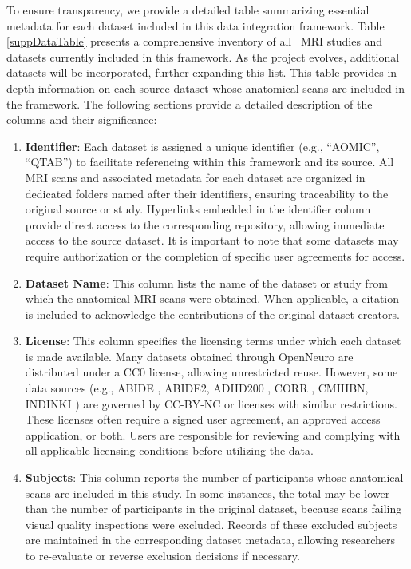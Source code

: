 
To ensure transparency, we provide a detailed table summarizing essential metadata for each dataset included in this data integration framework. 
Table \ref{suppDataTable} presents a comprehensive inventory of all \NumDatasets\ MRI studies and datasets currently included in this framework.
As the project evolves, additional datasets will be incorporated, further expanding this list. This table provides in-depth 
information on each source dataset whose anatomical scans are included in the framework. The following sections provide a detailed description 
of the columns and their significance:

\begin{enumerate}
    \item \textbf{Identifier}: Each dataset is assigned a unique identifier (e.g., ``AOMIC'', ``QTAB'') to facilitate referencing within this framework and its source. 
    All MRI scans and associated metadata for each dataset are organized in dedicated folders named after their identifiers, ensuring traceability to the original source or study. 
    Hyperlinks embedded in the identifier column provide direct access to the corresponding repository, allowing immediate access to the source dataset.
    It is important to note that some datasets may require authorization or the completion of specific user agreements for access.

    \item \textbf{Dataset Name}: This column lists the name of the dataset or study from which the anatomical MRI scans were obtained. 
    When applicable, a citation is included to acknowledge the contributions of the original dataset creators.

    \item \textbf{License}: This column specifies the licensing terms under which each dataset is made available. 
    Many datasets obtained through OpenNeuro \cite{markiewicz2021openneuro} are distributed under a CC0 license, allowing unrestricted reuse.
    However, some data sources (e.g., ABIDE \cite{di2014autism}, ABIDE2, ADHD200 \cite{adhd2012adhd}, CORR \cite{zuo2014open}, CMIHBN, INDINKI \cite{nooner2012nki}) are governed by CC-BY-NC or licenses with similar restrictions.
    These licenses often require a signed user agreement, an approved access application, or both. Users are responsible for reviewing and complying with all applicable licensing conditions before utilizing the data. 
    
    \item \textbf{Subjects}:  This column reports the number of participants whose anatomical scans are included in this study.
    In some instances, the total may be lower than the number of participants in the original dataset, because scans failing visual quality inspections were excluded.
    Records of these excluded subjects are maintained in the corresponding dataset metadata, allowing researchers to re-evaluate or reverse exclusion decisions if necessary.


\end{enumerate}
